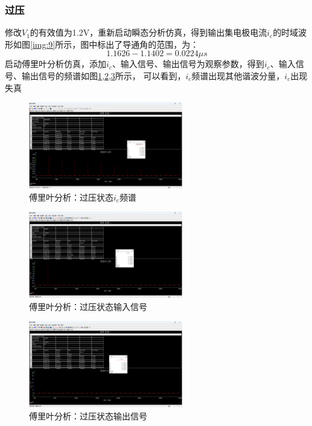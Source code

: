 \documentclass[UTF8]{ctexart}
\begin{document}
\subsubsection{过压}
修改$V_1$的有效值为1.2V，重新启动瞬态分析仿真，得到输出集电极电流$i_c$的时域波形如图\ref{img:9}所示，图中标出了导通角的范围，为：
$$
1.1626-1.1402=0.0224\mu s
$$
启动傅里叶分析仿真，添加$i_c$、输入信号、输出信号为观察参数，得到$i_c$、输入信号、输出信号的频谱如图\ref{img:10},\ref{img:11},\ref{img:12}所示，
可以看到，$i_c$频谱出现其他谐波分量，$i_c$出现失真
\begin{figure}[htbp]
    \centering
    \includegraphics[width=0.6\textwidth]{10.png}
    \caption{傅里叶分析：过压状态$i_c$频谱}
    \label{img:10}
\end{figure}
\begin{figure}[htbp]
    \centering
    \includegraphics[width=0.6\textwidth]{11.png}
    \caption{傅里叶分析：过压状态输入信号}
    \label{img:11}
\end{figure}
\begin{figure}[htbp]
    \centering
    \includegraphics[width=0.6\textwidth]{12.png}
    \caption{傅里叶分析：过压状态输出信号}
    \label{img:12}
\end{figure}
\end{document}
